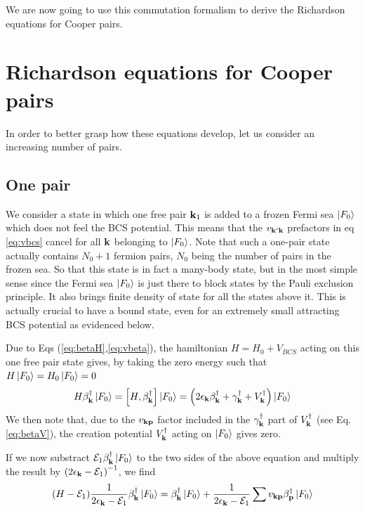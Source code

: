 \documentclass[aps,prb,amsmath,amssymb,preprint,superscriptaddress]{revtex4-1}
\newcommand{\fo}{\ensuremath{\ket{F_0}}}
\renewcommand{\E}{\ensuremath{\mathcal{E}}}
\begin{document}
We are now going to use this commutation formalism to derive the Richardson equations for Cooper pairs. 

\section{Richardson equations for Cooper pairs\label{sec:rich}}
In order to better grasp how these equations develop, let us  consider an increasing number of pairs. 
\subsection{One pair}
We consider a state in which one free pair $\mathbf{k}_1$ is added to a frozen Fermi sea $\left|F_0\right>$ which does not feel the BCS potential.  This means that the $v_{\mathbf{k}'\mathbf{k}}$ prefactors in eq \eqref{eq:vbcs} cancel for all $\mathbf{k}$ belonging to $\left|F_0\right>$.  Note that such a one-pair state actually contains $N_0+1$ fermion pairs, $N_0$ being the number of pairs in the frozen sea.  So that this state is in fact a many-body state, but in the most simple sense since the Fermi sea $\left|F_0\right>$ is just there to block states by the Pauli exclusion principle.  It also  brings finite density of state for all the states above it. This is actually crucial to have a bound state, even for an extremely small attracting BCS potential as evidenced below. 

Due to Eqs (\ref{eq:betaH},\ref{eq:vbeta}), the hamiltonian $H=H_0+V_{BCS}$ acting on this one free pair state gives, by taking the zero energy such that $H\left|F_0\right>=H_0\left|F_0\right>=0$
\begin{equation}
H\beta^{\dagger}_\vk\fo=\com{H}{\beta^{\dagger}_\vk}\fo=\br{2\epsilon_\vk\beta^{\dagger}_\vk+\gamma^{\dagger}_\vk+V^{\dagger}_\vk}\fo
\end{equation}
We then note that, due to the $v_{\mathbf{k}\mathbf{p}}$ factor included in the $\gamma^{\dagger}_{\mathbf{k}}$ part of $V^{\dagger}_{\mathbf{k}}$ (see Eq. \ref{eq:betaV}), the creation potential $V^{\dagger}_{\mathbf{k}}$ acting on \fo{ }gives zero.

If we now substract $\E_1\beta^{\dagger}_\vk\fo$ to the two sides of the above equation and multiply the result by $\br{2\epsilon_\vk-\E_1}^{-1}$, we find
\begin{equation}\label{eq:HE1}
(H-\E_1)\nth{2\epsilon_\vk-\E_1}\beta^{\dagger}_\vk\fo=\beta^{\dagger}_\vk\fo+\nth{2\epsilon_\vk-\E_1}\sum{}v_{\vk\vp}\beta^{\dagger}_\vp\fo
\end{equation}
\end{document}
